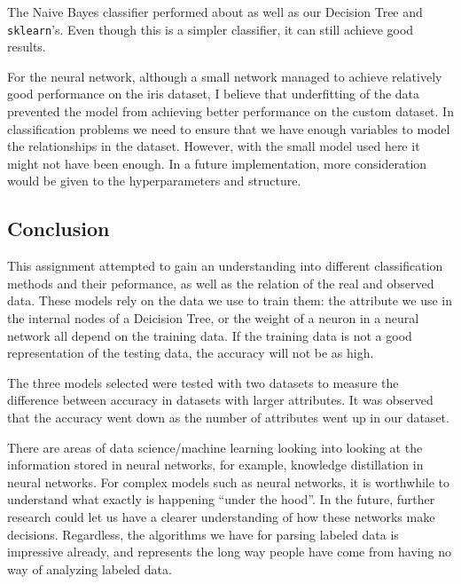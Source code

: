 \documentclass[
  paper=a4,
,captions=tableheading
]{scrartcl}
\newcommand{\passthrough}[1]{#1}
\begin{document}
The Naive Bayes classifier performed about as well as our Decision Tree
and \passthrough{\lstinline!sklearn!}'s. Even though this is a simpler
classifier, it can still achieve good results.

For the neural network, although a small network managed to achieve
relatively good performance on the iris dataset, I believe that
underfitting of the data prevented the model from achieving better
performance on the custom dataset. In classification problems we need to
ensure that we have enough variables to model the relationships in the
dataset. However, with the small model used here it might not have been
enough. In a future implementation, more consideration would be given to
the hyperparameters and structure.

\hypertarget{conclusion}{%
\subsection{Conclusion}\label{conclusion}}

This assignment attempted to gain an understanding into different
classification methods and their peformance, as well as the relation of
the real and observed data. These models rely on the data we use to
train them: the attribute we use in the internal nodes of a Deicision
Tree, or the weight of a neuron in a neural network all depend on the
training data. If the training data is not a good representation of the
testing data, the accuracy will not be as high.

The three models selected were tested with two datasets to measure the
difference between accuracy in datasets with larger attributes. It was
observed that the accuracy went down as the number of attributes went up
in our dataset.

There are areas of data science/machine learning looking into looking at
the information stored in neural networks, for example, knowledge
distillation in neural networks. For complex models such as neural
networks, it is worthwhile to understand what exactly is happening
``under the hood''. In the future, further research could let us have a
clearer understanding of how these networks make decisions. Regardless,
the algorithms we have for parsing labeled data is impressive already,
and represents the long way people have come from having no way of
analyzing labeled data.
\end{document}
